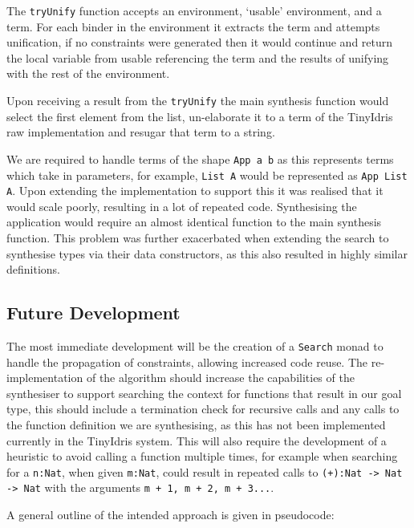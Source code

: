 \documentclass[a4paper]{article}
\begin{document}
The \texttt{tryUnify} function accepts an environment, `usable' environment, and a term. For each binder in the environment it 
extracts the term and attempts unification, if no constraints were generated then it would continue and return the 
local variable from usable referencing the term and the results of unifying with the rest of the environment.

Upon receiving a result from the \texttt{tryUnify} the main synthesis function would select the first element from the list, 
un-elaborate it to a term of the TinyIdris raw implementation and resugar that term to a string. 

We are required to handle terms of the shape \texttt{App a b} as this represents terms which take in parameters, for example, 
\texttt{List A} would be represented as \texttt{App List A}. Upon extending the implementation to support this it was realised that
it would scale poorly, resulting in a lot of repeated code. Synthesising the application would require an almost identical
function to the main synthesis function. This problem was further exacerbated when extending the search 
to synthesise types via their data constructors, as this also resulted in highly similar definitions. 

\clearpage
\subsection{Future Development}
\label{sec:orgcd969f6}

The most immediate development will be the creation of a \texttt{Search} monad to handle the propagation of constraints, allowing 
increased code reuse. The re-implementation of the algorithm should increase the capabilities of the synthesiser to support searching
the context for functions that result in our goal type, this should include a termination check for 
recursive calls and any calls to the function definition we are synthesising, as this has not been implemented currently
in the TinyIdris system. This will also require the development of a heuristic to avoid calling a function multiple times, for example
when searching for a \texttt{n:Nat}, when given \texttt{m:Nat}, could result in repeated calls to \texttt{(+):Nat -> Nat -> Nat} with the arguments 
\texttt{m + 1, m + 2, m + 3...}. 

A general outline of the intended approach is given in pseudocode:
\end{document}
